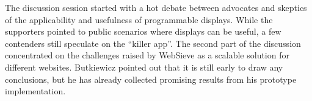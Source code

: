 The discussion session started with a hot debate between advocates and
skeptics of the applicability and usefulness of programmable displays.
While the supporters pointed to public scenarios where displays can be
useful, a few contenders still speculate on the ``killer
app''. The second part of the discussion concentrated on the
challenges raised by WebSieve as a scalable
solution for different websites. Butkiewicz pointed out that it is still
early to draw any conclusions, but he has already collected promising
results from his prototype implementation.
